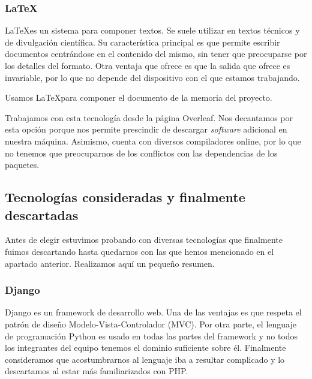\subsubsection{\LaTeX}
\LaTeX es un sistema para componer textos. Se suele utilizar en textos técnicos y de divulgación científica. Su característica principal es que permite escribir documentos centrándose en el contenido del mismo, sin tener que preocuparse por los detalles del formato. Otra ventaja que ofrece es que la salida que ofrece es invariable, por lo que no depende del dispositivo con el que estamos trabajando. \par 

Usamos \LaTeX para componer el documento de la memoria del proyecto. \par 

Trabajamos con esta tecnología desde la página Overleaf. Nos decantamos por esta opción porque nos permite prescindir de descargar \textit{software} adicional en nuestra máquina. Asimismo, cuenta con diversos compiladores online, por lo que no tenemos que preocuparnos de los conflictos con las dependencias de los paquetes. \par 

\subsection{Tecnologías consideradas y finalmente descartadas}
\label{subsec:rejected}
Antes de elegir estuvimos probando con diversas tecnologías que finalmente fuimos descartando hasta quedarnos con las que hemos mencionado en el apartado anterior. Realizamos aquí un pequeño resumen. \par 

\subsubsection{Django}
Django es un framework de desarrollo web. Una de las ventajas es que respeta el patrón de diseño Modelo-Vista-Controlador (MVC). Por otra parte, el lenguaje de programación Python es usado en todas las partes del framework y no todos los integrantes del equipo tenemos el dominio suficiente sobre él. Finalmente consideramos que acostumbrarnos al lenguaje iba a resultar complicado y lo descartamos al estar más familiarizados con PHP. \par 


